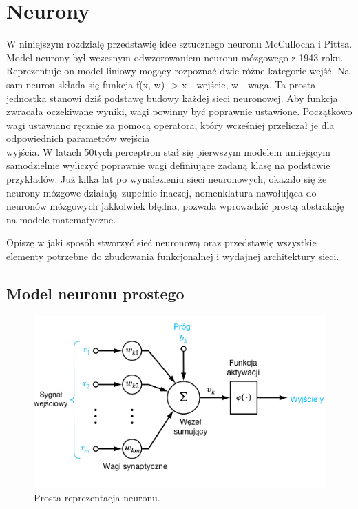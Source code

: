 \documentclass[12pt,a4paper,twoside,titlepage,openright]{book}
\begin{document}

\chapter{Neurony}
W niniejszym rozdzialę przedstawię idee sztucznego neuronu McCullocha i Pittsa. Model neurony był wczesnym odwzorowaniem neuronu mózgowego z 1943 roku. Reprezentuje on model liniowy mogący rozpoznać dwie różne kategorie wejść. Na sam neuron składa się funkcja f(x, w) -> x - wejście, w - waga. Ta prosta jednostka stanowi dziś podstawę budowy każdej sieci neuronowej. Aby funkcja zwracała oczekiwane wyniki, wagi powinny być poprawnie ustawione. Początkowo wagi ustawiano ręcznie za pomocą operatora, który wcześniej przeliczał je dla odpowiednich parametrów wejścia\\wyjścia. W latach 50tych perceptron stał się pierwszym modelem umiejącym samodzielnie wyliczyć poprawnie wagi definiujące zadaną klasę na podstawie przykładów. Już kilka lat po wynalezieniu sieci neuronowych, okazało się że neurony mózgowe działają zupełnie inaczej, nomenklatura nawołująca do neuronów mózgowych jakkolwiek błędna, pozwala wprowadzić prostą abstrakcję na modele matematyczne.

Opiszę w jaki sposób stworzyć sieć neuronową oraz przedstawię wszystkie elementy potrzebne do zbudowania funkcjonalnej i wydajnej architektury sieci.

\section{Model neuronu prostego}
\begin{figure}[h]
	\centering
			\includegraphics[resolution=120]{Neuron.png}
		\caption{Prosta reprezentacja neuronu.}
\end{figure}
\end{document}

